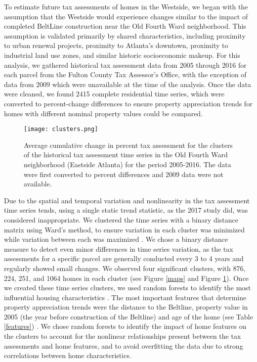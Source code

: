 \documentclass{acm_proc_article-sp}
\begin{document}
To estimate future tax assessments of homes in the Westside, we began with the assumption that the Westside would experience changes similar to the impact of completed BeltLine construction near the Old Fourth Ward neighborhood. This assumption is validated primarily by shared characteristics, including proximity to urban renewal projects, proximity to Atlanta's downtown, proximity to industrial land use zones, and similar historic socioeconomic makeup. For this analysis, we gathered historical tax assessment data from 2005 through 2016 for each parcel from the Fulton County Tax Assessor's Office, with the exception of data from 2009 which were unavailable at the time of the analysis. Once the data were cleaned, we found 2415 complete residential time series, which were converted to percent-change differences to ensure property appreciation trends for homes with different nominal property values could be compared.

\begin{figure}[h]
\centering
  \texttt{[image: clusters.png]} %
\caption{Average cumulative change in percent tax assessment for the clusters of the historical tax assessment time series in the Old Fourth Ward neighborhood (Eastside Atlanta) for the period 2005-2016. The data were first converted to percent differences and 2009 data were not available.}
\label{clusters}
\end{figure}

Due to the spatial and temporal variation and nonlinearity in the tax assessment time series tends, using a single static trend statistic, as the 2017 study did, was considered inappropriate. We clustered the time series with a binary distance matrix using Ward's method, to ensure variation in each cluster was minimized while variation between each was maximized \cite{ward63}. We chose a binary distance measure to detect even minor differences in time series variation, as the tax assessments for a specific parcel are generally conducted every 3 to 4 years and regularly showed small changes. We observed four significant clusters, with 876, 224, 251, and 1064 homes in each cluster (see Figure  \ref{maps} and Figure \ref{clusters}). Once we created these time series clusters, we used random forests to identify the most influential housing characteristics \cite{brei01}. The most important features that determine property appreciation trends were the distance to the Beltline, property value in 2005 (the year before construction of the Beltline) and age of the home (see Table \ref{features}) . We chose random forests to identify the impact of home features on the clusters to account for the nonlinear relationships present between the tax assessments and home features, and to avoid overfitting the data due to strong correlations between home characteristics.
\end{document}
